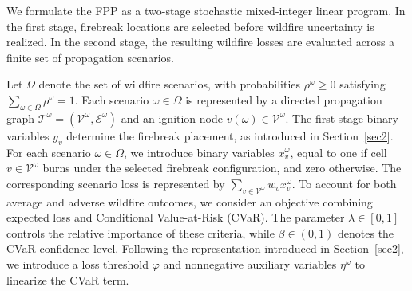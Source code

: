 \documentclass{itor}
\begin{document}
We formulate the FPP as a two-stage stochastic mixed-integer
linear program. In the first stage, firebreak locations are
selected before wildfire uncertainty is realized. In the
second stage, the resulting wildfire losses are evaluated
across a finite set of propagation scenarios.

Let $\Omega$ denote the set of wildfire scenarios, with
probabilities $\rho^\omega \geq 0$ satisfying
$\sum_{\omega\in\Omega}\rho^\omega=1$.
Each scenario $\omega\in\Omega$ is represented by a
directed propagation graph
$\mathcal{T}^\omega=(\mathcal{V}^\omega,
\mathcal{E}^\omega)$ and an ignition node
$v(\omega)\in\mathcal{V}^\omega$. The first-stage binary variables $y_v$ determine the
firebreak placement, as introduced in
Section~\ref{sec2}. For each scenario $\omega\in\Omega$,
we introduce binary variables $x_v^\omega$, equal to
one if cell $v\in\mathcal{V}^\omega$ burns under the
selected firebreak configuration, and zero otherwise.
The corresponding scenario loss is represented by
$\sum_{v\in\mathcal{V}^\omega}w_vx_v^\omega$. To account for both average and adverse wildfire outcomes,
we consider an objective combining expected loss and
Conditional Value-at-Risk (CVaR). The parameter
$\lambda\in[0,1]$ controls the relative importance
of these criteria, while $\beta\in(0,1)$ denotes
the CVaR confidence level. Following the representation
introduced in Section~\ref{sec2}, we introduce a loss
threshold $\varphi$ and nonnegative auxiliary variables
$\eta^\omega$ to linearize the CVaR term.
\end{document}
